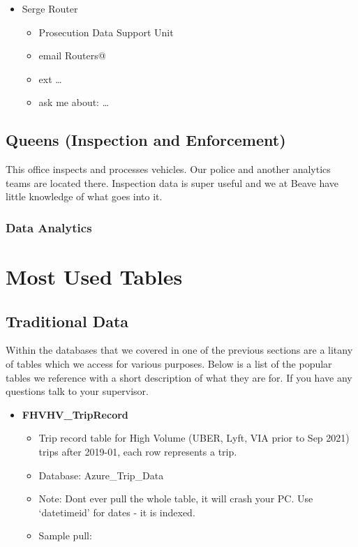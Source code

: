 \documentclass[
]{book}
\providecommand{\tightlist}{%
  \setlength{\itemsep}{0pt}\setlength{\parskip}{0pt}}
\begin{document}
\begin{itemize}
\tightlist
\item
  Serge Router

  \begin{itemize}
  \tightlist
  \item
    Prosecution Data Support Unit
  \item
    email Routers@
  \item
    ext \ldots{}
  \item
    ask me about: \ldots{}
  \end{itemize}
\end{itemize}

\hypertarget{queens-inspection-and-enforcement}{%
\section{Queens (Inspection and Enforcement)}\label{queens-inspection-and-enforcement}}

This office inspects and processes vehicles. Our police and another analytics teams are located there. Inspection data is super useful and we at Beave have little knowledge of what goes into it.

\hypertarget{data-analytics-1}{%
\subsection{Data Analytics}\label{data-analytics-1}}

\hypertarget{most-used-tables}{%
\chapter{Most Used Tables}\label{most-used-tables}}

\hypertarget{traditional-data}{%
\section{Traditional Data}\label{traditional-data}}

Within the databases that we covered in one of the previous sections are a litany of tables which we access for various purposes. Below is a list of the popular tables we reference with a short description of what they are for. If you have any questions talk to your supervisor.

\begin{itemize}
\tightlist
\item
  \textbf{FHVHV\_TripRecord}

  \begin{itemize}
  \tightlist
  \item
    Trip record table for High Volume (UBER, Lyft, VIA prior to Sep 2021) trips after 2019-01, each row represents a trip.
  \item
    Database: Azure\_Trip\_Data
  \item
    Note: Dont ever pull the whole table, it will crash your PC. Use `datetimeid' for dates - it is indexed.
  \item
    Sample pull:
  \end{itemize}
\end{itemize}
\end{document}
